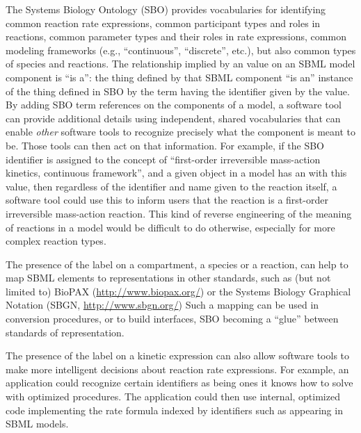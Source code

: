 The Systems Biology Ontology (SBO) provides vocabularies for
identifying common reaction rate expressions, common
participant types and roles in reactions, common parameter
types and their roles in rate expressions, common modeling
frameworks (e.g., ``continuous'', ``discrete'', etc.), but also common types of species and reactions.  The
relationship implied by an  value on an SBML model
component is ``is a'': the thing defined by that SBML component
``is an'' instance of the thing defined in SBO by the term having the
identifier given by the   value.  By adding
SBO term references on the components of a model, a software tool
can provide additional details using independent, shared
vocabularies that can enable \emph{other} software tools to
recognize precisely what the component is meant to be.  Those
tools can then act on that information.  For example, if the SBO
identifier  is assigned to the concept of
``first-order irreversible mass-action kinetics, continuous
framework'', and a given \KineticLaw object in a model has an
  with this value, then regardless of the
identifier and name given to the reaction itself, a software tool
could use this to inform users that the reaction is a first-order
irreversible mass-action reaction.  This kind of reverse
engineering of the meaning of reactions in a model would be
difficult to do otherwise, especially for more complex reaction
types.

The presence of the label on a compartment, a species or a reaction, can help to map SBML elements to representations in other standards, such as (but not limited to) BioPAX (\url{http://www.biopax.org/}) or the Systems Biology Graphical Notation (SBGN, \url{http://www.sbgn.org/})  Such a mapping can be used in conversion procedures, or to build interfaces, SBO becoming a ``glue'' between standards of representation.

The presence of the label on a kinetic expression can also allow
software tools to make more intelligent decisions about reaction
rate expressions.  For example, an application could recognize
certain identifiers as being ones it knows how to solve with
optimized procedures.  The application could then use internal,
optimized code implementing the rate formula indexed by
identifiers such as  appearing in SBML models.


